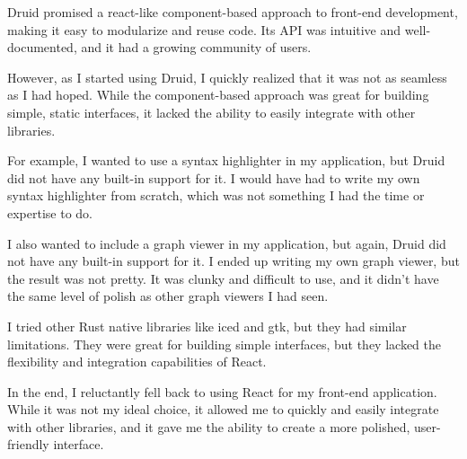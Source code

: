 Druid promised a react-like component-based approach to front-end development, making it easy to modularize and reuse code. Its API was intuitive and well-documented, and it had a growing community of users.

However, as I started using Druid, I quickly realized that it was not as seamless as I had hoped. While the component-based approach was great for building simple, static interfaces, it lacked the ability to easily integrate with other libraries.

For example, I wanted to use a syntax highlighter in my application, but Druid did not have any built-in support for it. I would have had to write my own syntax highlighter from scratch, which was not something I had the time or expertise to do.

I also wanted to include a graph viewer in my application, but again, Druid did not have any built-in support for it. I ended up writing my own graph viewer, but the result was not pretty. It was clunky and difficult to use, and it didn't have the same level of polish as other graph viewers I had seen.

I tried other Rust native libraries like iced and gtk, but they had similar limitations. They were great for building simple interfaces, but they lacked the flexibility and integration capabilities of React.

In the end, I reluctantly fell back to using React for my front-end application. While it was not my ideal choice, it allowed me to quickly and easily integrate with other libraries, and it gave me the ability to create a more polished, user-friendly interface.

